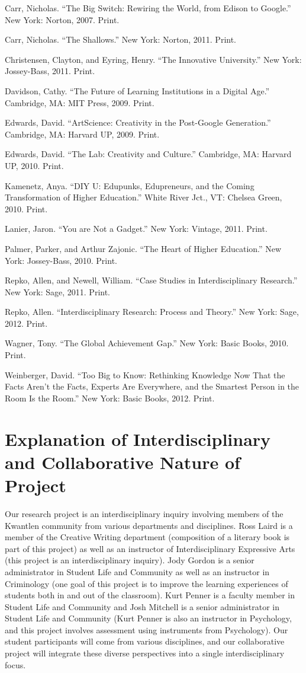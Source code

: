 \documentclass[letterpaper,10pt,headsepline]{scrreprt}
\begin{document}
Carr, Nicholas. ``The Big Switch: Rewiring the World, from Edison to Google.'' New York: Norton, 2007. Print.

Carr, Nicholas. ``The Shallows.'' New York: Norton, 2011. Print.

Christensen, Clayton, and Eyring, Henry. ``The Innovative University.'' New York: Jossey-Bass, 2011. Print.

Davidson, Cathy. ``The Future of Learning Institutions in a Digital Age.'' Cambridge, MA: MIT Press, 2009. Print.

Edwards, David. ``ArtScience: Creativity in the Post-Google Generation.'' Cambridge, MA: Harvard UP, 2009. Print.

Edwards, David. ``The Lab: Creativity and Culture.'' Cambridge, MA: Harvard UP, 2010. Print.

Kamenetz, Anya. ``DIY U: Edupunks, Edupreneurs, and the Coming Transformation of Higher Education.'' White River Jct., VT: Chelsea Green, 2010. Print.

Lanier, Jaron. ``You are Not a Gadget.'' New York: Vintage, 2011. Print.

Palmer, Parker, and Arthur Zajonic. ``The Heart of Higher Education.'' New York: Jossey-Bass, 2010. Print.

Repko, Allen, and Newell, William. ``Case Studies in Interdisciplinary Research.'' New York: Sage, 2011. Print.

Repko, Allen. ``Interdisciplinary Research: Process and Theory.'' New York: Sage, 2012. Print.

Wagner, Tony. ``The Global Achievement Gap.'' New York: Basic Books, 2010. Print.

Weinberger, David. ``Too Big to Know: Rethinking Knowledge Now That the Facts Aren't
the Facts, Experts Are Everywhere, and the Smartest Person in the Room Is the Room.'' New York: Basic Books, 2012. Print.


\section{Explanation of Interdisciplinary and Collaborative Nature of Project}

Our research project is an interdisciplinary inquiry involving members of the
Kwantlen community from various departments and disciplines. Ross Laird is a
member of the Creative Writing department (composition of a literary book is
part of this project) as well as an instructor of Interdisciplinary Expressive
Arts (this project is an interdisciplinary inquiry). Jody Gordon is a senior
administrator in Student Life and Community as well as an instructor in
Criminology (one goal of this project is to improve the learning experiences
of students both in and out of the classroom). Kurt Penner is a faculty member
in Student Life and Community and Josh Mitchell is a senior administrator in
Student Life and Community (Kurt Penner is also an instructor in Psychology,
and this project involves assessment using instruments from Psychology). Our
student participants will come from various disciplines, and our collaborative
project will integrate these diverse perspectives into a single
interdisciplinary focus.
\end{document}
